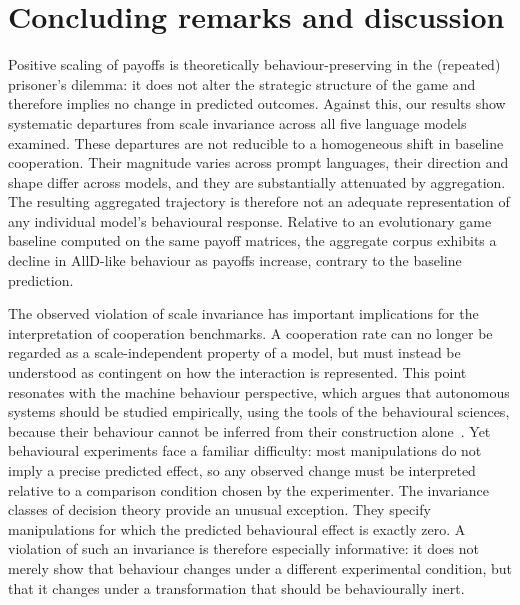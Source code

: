 \documentclass[11pt,a4paper]{article}
\newcommand{\rev}[1]{{\color{red}#1}}
\newcommand{\rev}[1]{#1}
\begin{document}
\section{Concluding remarks and discussion}\label{sec:discussion}

Positive scaling of payoffs is theoretically behaviour-preserving in the (repeated) prisoner's dilemma: \rev{it does not alter the strategic structure of the game and therefore implies} no change in predicted outcomes. Against this, our results show systematic departures from scale invariance across all five language models examined. These departures are not reducible to a homogeneous shift in baseline cooperation. Their magnitude varies across prompt languages, their direction and shape differ across models, and they are substantially attenuated by aggregation. 
The resulting aggregated trajectory is therefore not an adequate representation of any individual model's behavioural response. 
Relative to an evolutionary game baseline computed on the same payoff matrices, the aggregate corpus exhibits a decline in AllD-like behaviour as payoffs increase, contrary to the baseline prediction.

The observed violation of scale invariance has important implications for the interpretation of cooperation benchmarks. A cooperation rate can no longer be regarded as a scale-independent property of a model, but must instead be understood as contingent on how the interaction is represented. This point resonates with the machine behaviour perspective, which argues that autonomous systems should be studied empirically, using the tools of the behavioural sciences, because their behaviour cannot be inferred from their construction alone~\cite{rahwan2019machine}. Yet behavioural experiments face a familiar difficulty: most manipulations do not imply a precise predicted effect, so any observed change must be interpreted relative to a comparison condition chosen by the experimenter. The invariance classes of decision theory provide an unusual exception. They specify manipulations for which the predicted behavioural effect is exactly zero. A violation of such an invariance is therefore especially informative: it does not merely show that behaviour changes under a different experimental condition, but that it changes under a transformation that should be behaviourally inert.
\end{document}
